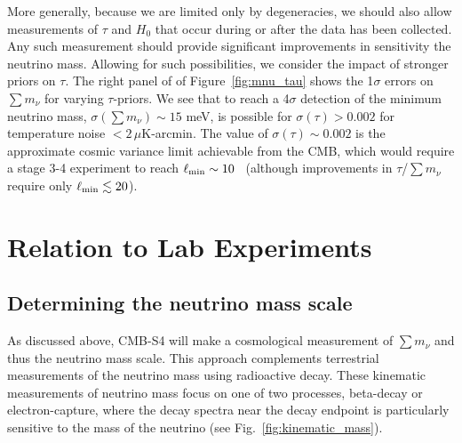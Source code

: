 More generally, because we are limited only by degeneracies, we should also allow measurements of $\tau$ and $H_0$ that occur during or after the data has been collected.  Any such measurement should provide significant improvements in sensitivity the neutrino mass. Allowing for such possibilities, we consider the impact of stronger priors on $\tau$.  The right panel of of Figure~\ref{fig:mnu_tau} shows the 1$\sigma$ errors on $\sum m_\nu$ for varying $\tau$-priors.  We see that to reach a 4$\sigma$ detection of the minimum neutrino mass, $\sigma(\sum m_\nu) \sim 15$ meV, is possible for $\sigma(\tau) > 0.002$ for temperature noise $< 2 \, \mu$K-arcmin.  The value of $\sigma(\tau) \sim 0.002$ is the approximate cosmic variance limit achievable from the CMB, which would require a stage 3-4 experiment to reach $\ell_{\rm min} \sim 10$~\cite{Allison:2015qca} (although improvements in $\tau$/$\sum m_\nu$ require only $\ell_{\rm min} \lesssim 20$).

















\section{Relation to Lab Experiments}\label{sec:lab}


\subsection{Determining the neutrino mass scale}
As discussed above, CMB-S4 will make a cosmological measurement of $\sum m_\nu$ and thus the neutrino mass scale. This approach complements terrestrial measurements of the neutrino mass using radioactive decay. These kinematic measurements of neutrino mass focus on one of two processes, beta-decay or electron-capture, where the decay spectra near the decay endpoint is particularly sensitive to the mass of the neutrino (see Fig.~\ref{fig:kinematic_mass}).

